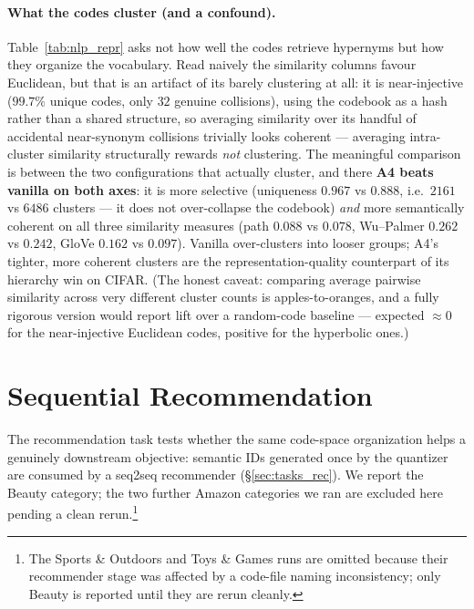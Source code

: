 \documentclass[12pt]{report}
\begin{document}
\paragraph{What the codes cluster (and a confound).} Table~\ref{tab:nlp_repr} asks not how well the codes retrieve hypernyms but how they organize the vocabulary. Read naively the similarity columns favour Euclidean, but that is an artifact of its barely clustering at all: it is near-injective ($99.7\%$ unique codes, only $32$ genuine collisions), using the codebook as a hash rather than a shared structure, so averaging similarity over its handful of accidental near-synonym collisions trivially looks coherent --- averaging intra-cluster similarity structurally rewards \emph{not} clustering. The meaningful comparison is between the two configurations that actually cluster, and there \textbf{A4 beats vanilla on both axes}: it is more selective (uniqueness $0.967$ vs $0.888$, i.e.\ $2161$ vs $6486$ clusters --- it does not over-collapse the codebook) \emph{and} more semantically coherent on all three similarity measures (path $0.088$ vs $0.078$, Wu--Palmer $0.262$ vs $0.242$, GloVe $0.162$ vs $0.097$). Vanilla over-clusters into looser groups; A4's tighter, more coherent clusters are the representation-quality counterpart of its hierarchy win on CIFAR. (The honest caveat: comparing average pairwise similarity across very different cluster counts is apples-to-oranges, and a fully rigorous version would report lift over a random-code baseline --- expected $\approx 0$ for the near-injective Euclidean codes, positive for the hyperbolic ones.)

\section{Sequential Recommendation}
\label{sec:exp_rec}

The recommendation task tests whether the same code-space organization helps a genuinely downstream objective: semantic IDs generated once by the quantizer are consumed by a seq2seq recommender (\S\ref{sec:tasks_rec}). We report the Beauty category; the two further Amazon categories we ran are excluded here pending a clean rerun.\footnote{The Sports \& Outdoors and Toys \& Games runs are omitted because their recommender stage was affected by a code-file naming inconsistency; only Beauty is reported until they are rerun cleanly.}
\end{document}
